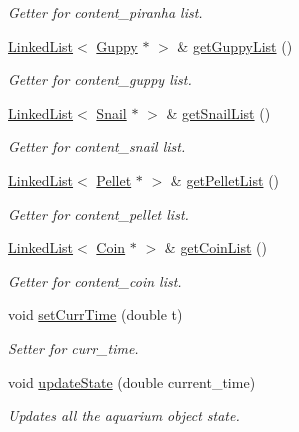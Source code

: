 \begin{DoxyCompactItemize}
\begin{DoxyCompactList}\small\item\em Getter for content\+\_\+piranha list. \end{DoxyCompactList}\item 
\mbox{\hyperlink{class_linked_list}{Linked\+List}}$<$ \mbox{\hyperlink{class_guppy}{Guppy}} $\ast$ $>$ \& \mbox{\hyperlink{class_aquarium_a3244b33f404c2887f04342754f17f4ee}{get\+Guppy\+List}} ()
\begin{DoxyCompactList}\small\item\em Getter for content\+\_\+guppy list. \end{DoxyCompactList}\item 
\mbox{\hyperlink{class_linked_list}{Linked\+List}}$<$ \mbox{\hyperlink{class_snail}{Snail}} $\ast$ $>$ \& \mbox{\hyperlink{class_aquarium_a278a38d4cf238908c4e3e170ea66841f}{get\+Snail\+List}} ()
\begin{DoxyCompactList}\small\item\em Getter for content\+\_\+snail list. \end{DoxyCompactList}\item 
\mbox{\hyperlink{class_linked_list}{Linked\+List}}$<$ \mbox{\hyperlink{class_pellet}{Pellet}} $\ast$ $>$ \& \mbox{\hyperlink{class_aquarium_a2d0eeed1f5776e13f0bbafc6844ce7a2}{get\+Pellet\+List}} ()
\begin{DoxyCompactList}\small\item\em Getter for content\+\_\+pellet list. \end{DoxyCompactList}\item 
\mbox{\hyperlink{class_linked_list}{Linked\+List}}$<$ \mbox{\hyperlink{class_coin}{Coin}} $\ast$ $>$ \& \mbox{\hyperlink{class_aquarium_a3b3592004ace881a5e11d19a8dc127e4}{get\+Coin\+List}} ()
\begin{DoxyCompactList}\small\item\em Getter for content\+\_\+coin list. \end{DoxyCompactList}\item 
void \mbox{\hyperlink{class_aquarium_aa613d1ce40335c46aef9e4a8f44487ea}{set\+Curr\+Time}} (double t)
\begin{DoxyCompactList}\small\item\em Setter for curr\+\_\+time. \end{DoxyCompactList}\item 
void \mbox{\hyperlink{class_aquarium_ac9fc0451e82c808d91a32a2e23e9f18e}{update\+State}} (double current\+\_\+time)
\begin{DoxyCompactList}\small\item\em Updates all the aquarium object state. \end{DoxyCompactList}\item 

\end{DoxyCompactItemize}
